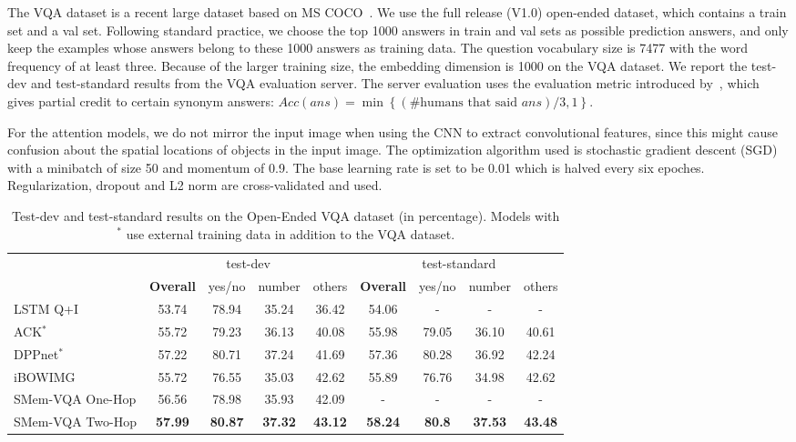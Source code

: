 The VQA dataset is a recent large dataset based on MS COCO~\cite{lin2014microsoft}. We use the full release (V1.0) open-ended dataset, which contains a train set and a val set. Following standard practice, we choose the top 1000 answers in train and val sets as possible prediction answers, and only keep the examples whose answers belong to these 1000 answers as training data. The question vocabulary size is 7477 with the word frequency of at least three.
Because of the larger training size, the embedding dimension is 1000 on the VQA dataset.
We report the test-dev and test-standard results from the VQA evaluation server.
The server evaluation uses the evaluation metric introduced by~\cite{DBLP:journals/corr/AntolALMBZP15}, which gives partial credit to certain synonym answers:
$Acc({ans}) = \min\left\{ (\text{\# humans that said }{ans})/3,1\right\}$.



For the attention models, we do not mirror the input image when using the CNN to extract convolutional features, since this might cause confusion about the spatial locations of objects in the input image.
The optimization algorithm used is stochastic gradient descent (SGD) with a minibatch of size 50 and momentum of 0.9.
The base learning rate is set to be 0.01 which is halved every six epoches. Regularization, dropout and L2 norm are cross-validated and used. 


\begin{table}[!t]
\centering
\caption{Test-dev and test-standard results on the Open-Ended VQA dataset (in percentage). Models with ${}^\ast$ use external training data in addition to the VQA dataset.}
\scriptsize
 \begin{tabular}{l || c c c c || c c c c} 
 \hline
 ~ & \multicolumn{4}{c||}{test-dev}  & \multicolumn{4}{c}{test-standard}\\ 
 ~ & \bf{Overall}  & yes/no  & number  & others & \bf{Overall}  & yes/no  & number  & others\\ \hline
 LSTM Q+I~\cite{DBLP:journals/corr/AntolALMBZP15} & 53.74 & 78.94  & 35.24  & 36.42 & 54.06 & -  & -  & -\\ ACK${}^\ast$~\cite{wu2015ask} & 55.72 & 79.23  & 36.13  & 40.08 & 55.98 & 79.05  & 36.10  & 40.61\\ DPPnet${}^\ast$~\cite{noh2015image} & 57.22 & 80.71  & 37.24  & 41.69 & 57.36 & 80.28  & 36.92  & 42.24\\ iBOWIMG~\cite{zhou2015simple} & 55.72 & 76.55  & 35.03  & 42.62 & 55.89 & 76.76  & 34.98  & 42.62\\ \hline 
 SMem-VQA One-Hop & 56.56 & 78.98 & 35.93  & 42.09 & - & -  & -  & -\\ SMem-VQA Two-Hop & \textbf{57.99} & \textbf{80.87}  & \textbf{37.32}  & \textbf{43.12} & \textbf{58.24} & \textbf{80.8}  & \textbf{37.53}  & \textbf{43.48}\\ \hline 
 \end{tabular}
\label{fig:baseline2}
\vspace{-0.15in}
\end{table}

